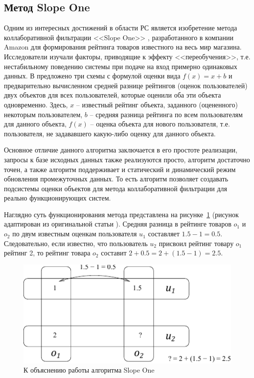 \documentclass[a4paper,14pt,openany,final]{extreport} %
\begin{document}
\subsection{Метод Slope One}

Одним из интересных достижений в области РС является изобретение метода коллаборативной фильтрации <<Slope One>> \cite{slopeone}, разработанного в компании Amazon для формирования рейтинга товаров известного на весь мир магазина. Исследователи изучали факторы, приводящие к эффекту <<переобучения>>, т.е. нестабильному поведению системы при подаче на вход примерно одинаковых данных. В \cite{slopeone} предложено три схемы с формулой оценки вида $f(x)=x+b$ и предварительно вычисленном средней разнице рейтингов (оценок пользователей) двух объектов для всех пользователей, которые оценили оба эти объекта одновременно.  Здесь, $x$ -- известный рейтинг объекта, заданного (оцененного) некоторым пользователем, $b$ -- средняя разница рейтинга по всем пользователям для данного объекта, $f(x)$ -- оценка объекта для нового пользователя, т.е. пользователя, не задававшего какую-либо оценку для данного объекта.

Основное отличие данного алгоритма заключается в его простоте реализации, запросы к базе исходных данных также реализуются просто, алгоритм достаточно точен, а также алгоритм поддерживает и статический и динамический режим обновления промежуточных данных. То есть алгоритм позволяет создавать подсистемы оценки объектов для метода коллаборативной фильтрации для реально функционирующих систем.

Наглядно суть функционирования метода представлена на рисунке~\ref{fig:slope-exp} (рисунок адаптирован из оригинальной статьи \cite{slopeone}). Средняя разница в рейтинге товаров $o_1$ и $o_2$ по двум известным оценкам пользователя $u_1$ составляет $1.5-1 = 0.5$. Следовательно, если известно, что пользователь $u_2$ присвоил рейтинг товару $o_1$ рейтинг 2, то рейтинг товара $o_2$ составит $2+0.5=2+(1.5-1)=2.5$.

\begin{figure}[htb]
  \centering
  \includegraphics[width=0.7\linewidth]{slopeone.pdf}
  \caption{К объяснению работы алгоритма Slope One}
  \label{fig:slope-exp}
\end{figure}
\end{document}
